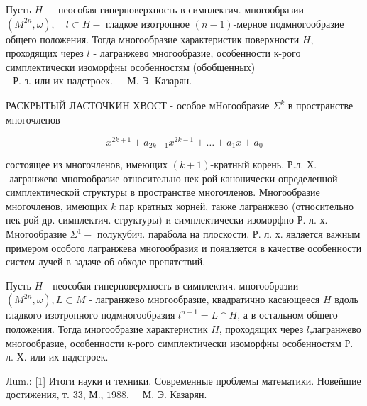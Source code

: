 \documentclass[10pt]{article}
\begin{document}
Пусть $H-$ неособая гиперповерхность в симплектич. многообразии $\left(M^{2 n}, \omega\right), \quad l \subset H-$ гладкое изотропное $(n-1)$-мерное подмногообразие общего положения. Тогда многообразие характеристик поверхности $H$, проходящих через $l$ - лагранжево многообразие, особенности к-рого симплектически изоморфны особенностям (обобщенных) $\begin{array}{ll}\text { Р. з. или их надстроек. } & \text { М. Э. Казарян. }\end{array}$



РАСКРЫТЫЙ ЛАСТОЧКИН ХВОСТ - особое мНогообразие $\Sigma^{k}$ в пространстве многочленов



\[

x^{2 k+1}+a_{2 k-1} x^{2 k-1}+\ldots+a_{1} x+a_{0}

\]



состоящее из многочленов, имеющих $(k+1)$-кратный корень. Р.л. Х. -лагранжево многообразие относительно нек-рой канонически определенной симплектической структуры в пространстве многочленов. Многообразие многочленов, имеющих $k$ пар кратных корней, также лагранжево (относительно нек-рой др. симплектич. структуры) и симплектически изоморфно Р. л. х. Многообразие $\Sigma^{1}-$ полукубич. парабола на плоскости. Р. л. х. является важным примером особого лагранжева многообразия и появляется в качестве особенности систем лучей в задаче об обходе препятствий.



Пусть $H$ - неособая гиперповерхность в симплектич. многообразии $\left(M^{2 n}, \omega\right), L \subset M$ - лагранжево многообразие, квадратично касающееся $H$ вдоль гладкого изотропного подмногообразия $l^{n-1}=L \cap H$, а в остальном общего положения. Тогда многообразие характеристик $H$, проходящих через $l$,лагранжево многообразие, особенности к-рого симплектически изоморфны особенностям Р. л. Х. или их надстроек.



Лum.: [1] Итоги науки и техники. Современные проблемы математики. Новейшие достижения, т. 33, М., $1988 . \quad$ М. Э. Казарян.
\end{document}
